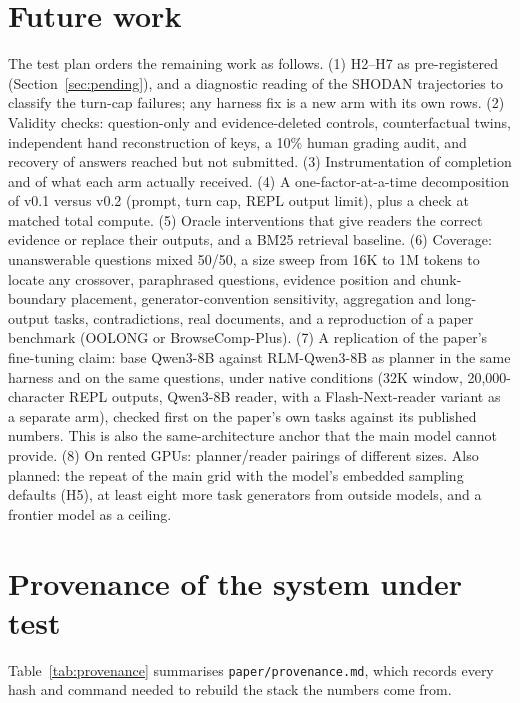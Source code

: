 \documentclass[11pt]{article}
\newcommand{\code}[1]{\texttt{#1}}
\begin{document}
\section{Future work}
\label{sec:future}

The test plan orders the remaining work as follows. (1) H2--H7 as pre-registered
(Section~\ref{sec:pending}), and a diagnostic reading of the SHODAN trajectories to
classify the turn-cap failures; any harness fix is a new arm with its own rows. (2) Validity checks: question-only and
evidence-deleted controls, counterfactual twins, independent hand reconstruction of
keys, a 10\% human grading audit, and recovery of answers reached but not submitted.
(3) Instrumentation of completion and of what each arm actually received. (4) A
one-factor-at-a-time decomposition of v0.1 versus v0.2 (prompt, turn cap, REPL
output limit), plus a check at matched total compute. (5) Oracle interventions that
give readers the correct evidence or replace their outputs, and a BM25 retrieval
baseline. (6) Coverage: unanswerable questions mixed 50/50, a size sweep from 16K to
1M tokens to locate any crossover, paraphrased questions, evidence position and
chunk-boundary placement, generator-convention sensitivity, aggregation and
long-output tasks, contradictions, real documents, and a reproduction of a paper
benchmark (OOLONG or BrowseComp-Plus). (7) A replication of the paper's fine-tuning claim: base Qwen3-8B against
RLM-Qwen3-8B as planner in the same harness and on the same questions, under native
conditions (32K window, 20,000-character REPL outputs, Qwen3-8B reader, with a
Flash-Next-reader variant as a separate arm), checked first on the paper's own tasks
against its published numbers. This is also the same-architecture anchor that the main
model cannot provide. (8) On rented GPUs: planner/reader pairings of different sizes.
Also planned: the repeat of the main grid with the model's embedded sampling defaults
(H5), at least eight
more task generators from outside models, and a frontier model as a ceiling. 

\section*{Provenance of the system under test}
\label{sec:provenance}
Table~\ref{tab:provenance} summarises \code{paper/provenance.md}, which records every
hash and command needed to rebuild the stack the numbers come from.
\end{document}
